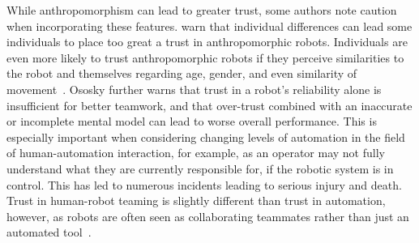 While anthropomorphism can lead to greater trust, some authors note caution when incorporating these features.
\citeauthor{culley_note_2013} warn that individual differences can lead some individuals to place too great a trust in anthropomorphic robots.
Individuals are even more likely to trust anthropomorphic robots if they perceive similarities to the robot and themselves regarding age, gender, and even similarity of movement~\citep{pak_multi-level_2014, verberne_trusting_2013}.
Ososky further warns that trust in a robot's reliability alone is insufficient for better teamwork, and that over-trust combined with an inaccurate or incomplete mental model can lead to worse overall performance.
This is especially important when considering changing levels of automation in the field of human-automation interaction, for example, as an operator may not fully understand what they are currently responsible for, if the robotic system is in control.
This has led to numerous incidents leading to serious injury and death.
Trust in human-robot teaming is slightly different than trust in automation, however, as robots are often seen as collaborating teammates rather than just an automated tool~\citep{ososky_building_2013}.


